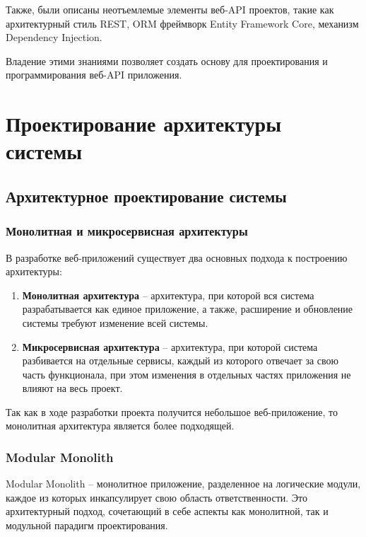 \documentclass[a4paper,12pt]{report}
\begin{document}
Также, были описаны неотъемлемые элементы веб-\acs{API} проектов, такие как архитектурный стиль \acs{REST}, \acs{ORM} фреймворк Entity Framework Core, 
механизм Dependency Injection.

Владение этими знаниями позволяет создать основу для проектирования и программирования веб-\acs{API} приложения.

\chapter{Проектирование архитектуры системы}\label{architecture_chapter_title}

\section{Архитектурное проектирование системы}

\subsection{Монолитная и микросервисная архитектуры}

В разработке веб-приложений существует два основных подхода к построению архитектуры:
\begin{enumerate}
    \item
        \textbf{Монолитная архитектура} -- архитектура, при которой вся система разрабатывается как единое приложение, 
        а также, расширение и обновление системы требуют изменение всей системы.
    \item
        \textbf{Микросервисная архитектура} -- архитектура, при которой система разбивается на отдельные сервисы, 
        каждый из которого отвечает за свою часть функционала, при этом изменения в отдельных частях приложения не влияют на весь проект.\cite{application_architecture}
\end{enumerate}

Так как в ходе разработки проекта получится небольшое веб-приложение, то монолитная архитектура является более подходящей.

\subsection{Modular Monolith}

Modular Monolith -- монолитное приложение, разделенное на логические модули, каждое из которых инкапсулирует свою область ответственности.
Это архитектурный подход, сочетающий в себе аспекты как монолитной, так и модульной парадигм проектирования.\cite{modular_monolith}
\end{document}
